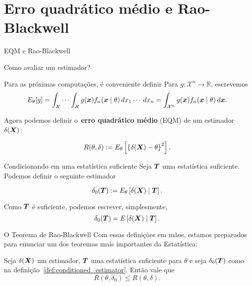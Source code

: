 \section*{Erro quadrático médio e Rao-Blackwell}
\begin{frame}{EQM e Rao-Blackwell}

Como avaliar um estimador?

\begin{defn}
Para as próximas computações, é conveniente definir
Para $g : \mathcal{X}^n \to \mathbb{R}$, escrevemos
\[ E_{\theta} [g] = \int_{\mathcal{X}} \cdots \int_{\mathcal{X}} g(\boldsymbol{x})f_n(\boldsymbol{x} \mid \theta)\, dx_1\cdots\,dx_n = \int_{\mathcal{X}^n} g(\boldsymbol{x})f_n(\boldsymbol{x} \mid \theta) \,d\boldsymbol{x}. \] 
\end{defn}

Agora podemos definir o~\textbf{erro quadrático médio} (EQM) de um estimador $\delta(\boldsymbol{X})$:
\begin{defn}
 \label{def:MSE}
 \begin{equation*}
  R(\theta, \delta) := E_{\theta} \left[\left\{\delta(\boldsymbol{X}) - \theta\right\}^2\right].
 \end{equation*}
\end{defn} 
\end{frame}

\begin{frame}{Condicionando em uma estatística suficiente}
 Seja $\boldsymbol{T}$ uma estatística suficiente.
 Podemos definir o seguinte estimador
 \begin{defn}
 \begin{equation*}
 \label{def:conditioned_estimator}
  \delta_0(\boldsymbol{T}) := E_{\theta} \left[ \delta(\boldsymbol{X}) \mid \boldsymbol{T} \right].
 \end{equation*}  
 \end{defn}
 Como $\boldsymbol{T}$ é suficiente, podemos escrever, simplesmente,
  \begin{equation*}
  \delta_0(\boldsymbol{T}) = E \left[ \delta(\boldsymbol{X}) \mid \boldsymbol{T} \right].
 \end{equation*}  
\end{frame}

\begin{frame}{O Teorema de Rao-Blackwell}
 Com essas definições em mãos, estamos preparados para enunciar um dos teoremas mais importantes da Estatística:
 \begin{theo}
  \label{thm:Rao-Blackwell}
  Seja $\delta(\boldsymbol{X})$ um estimador, $\boldsymbol{T}$ uma estatística suficiente para $\theta$ e seja $\delta_0(\boldsymbol{T})$ como na definição~\ref{def:conditioned_estimator}. 
  Então vale que
  \begin{equation*}
   R(\theta, \delta_0) \leq R(\theta, \delta).
  \end{equation*}
 \end{theo}
\end{frame}

